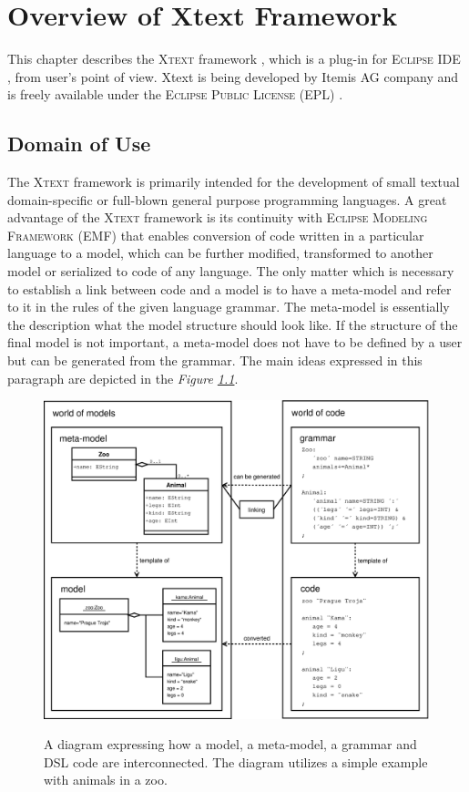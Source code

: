 \documentclass[12pt,notitlepage,a4paper]{report}
\begin{document}
\chapter {Overview of Xtext Framework}
This chapter describes the \textsc{Xtext} framework \cite{Xtext}, which is a plug-in for \textsc{Eclipse IDE} \cite{Eclipse}, from user's point of view. Xtext is being developed by Itemis AG company and is freely available under the \textsc{Eclipse Public License} (EPL) \cite{EPL}.

\section {Domain of Use}
\label{DomainOfUse}
The \textsc{Xtext} framework is primarily intended for the development of small textual domain-specific or full-blown general purpose programming languages. A great advantage of the  \textsc{Xtext} framework is its continuity with \textsc{Eclipse Modeling Framework} (EMF) \cite{EMF} that enables conversion of code written in a particular language to a model, which can be further modified, transformed to another model or serialized to code of any language. The only matter which is necessary to establish a link between code and a model is to have a meta-model and refer to it in the rules of the given language grammar. The meta-model is essentially the description what the model structure should look like. If the structure of the final model is not important, a meta-model does not have to be defined by a user but can be generated from the grammar. The main ideas expressed in this paragraph are depicted in the \textit{Figure \ref{ModelAndCode}}.

\begin{figure}[h!]
\centering
\caption{A diagram expressing how a model, a meta-model, a grammar and DSL code are interconnected. The diagram utilizes a simple example with animals in a zoo.}
\includegraphics[scale=0.30]{pictures/ModelsAndCode.eps}
\label{ModelAndCode}
\end{figure}
\noindent
\end{document}
